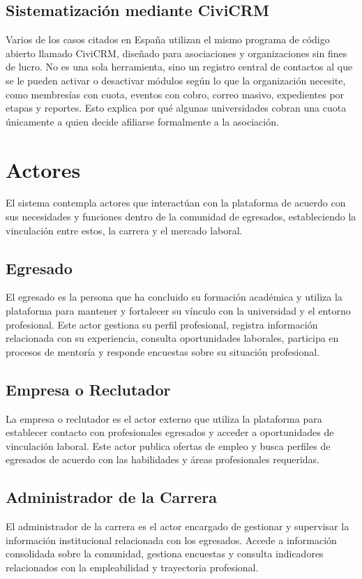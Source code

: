 \documentclass{./plantilla/umss}
\begin{document}
\subsection{Sistematización mediante CiviCRM}
Varios de los casos citados en España utilizan el mismo programa de código abierto llamado CiviCRM, diseñado para asociaciones y organizaciones sin fines de lucro. No es una sola herramienta, sino un registro central de contactos al que se le pueden activar o desactivar módulos según lo que la organización necesite, como membresías con cuota, eventos con cobro, correo masivo, expedientes por etapas y reportes. Esto explica por qué algunas universidades cobran una cuota únicamente a quien decide afiliarse formalmente a la asociación.

\section{Actores}

El sistema contempla actores que interactúan con la plataforma de acuerdo con sus necesidades y funciones dentro de la comunidad de egresados, estableciendo la vinculación entre estos, la carrera y el mercado laboral.

\subsection{Egresado}
El egresado es la persona que ha concluido su formación académica y utiliza la plataforma para mantener y fortalecer su vínculo con la universidad y el entorno profesional. Este actor gestiona su perfil profesional, registra información relacionada con su experiencia, consulta oportunidades laborales, participa en procesos de mentoría y responde encuestas sobre su situación profesional.

\subsection{Empresa o Reclutador}
La empresa o reclutador es el actor externo que utiliza la plataforma para establecer contacto con profesionales egresados y acceder a oportunidades de vinculación laboral. Este actor publica ofertas de empleo y busca perfiles de egresados de acuerdo con las habilidades y áreas profesionales requeridas.

\subsection{Administrador de la Carrera}
El administrador de la carrera es el actor encargado de gestionar y supervisar la información institucional relacionada con los egresados. Accede a información consolidada sobre la comunidad, gestiona encuestas y consulta indicadores relacionados con la empleabilidad y trayectoria profesional.
\end{document}
